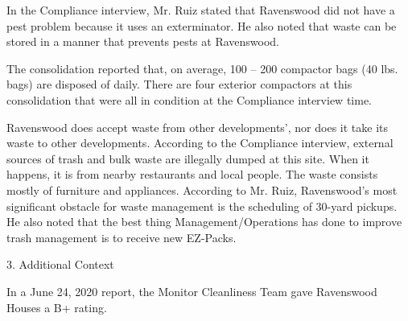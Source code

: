 In the Compliance interview, Mr. Ruiz stated that Ravenswood did not have a pest problem because it uses an exterminator. He also noted that waste can be stored in a manner that prevents pests at Ravenswood.

The consolidation reported that, on average, 100 -- 200 compactor bags (40 lbs. bags) are disposed of daily. There are four exterior compactors at this consolidation that were all in condition at the Compliance interview time.  

Ravenswood does accept waste from other developments', nor does it take its waste to other developments.  According to the Compliance interview, external sources of trash and bulk waste are illegally dumped at this site. When it happens, it is from nearby restaurants and local people. The waste consists mostly of furniture and appliances. According to Mr. Ruiz, Ravenswood's most significant obstacle for waste management is the scheduling of 30-yard pickups. He also noted that the best thing Management/Operations has done to improve trash management is to receive new EZ-Packs.

3. Additional Context

In a June 24, 2020 report, the Monitor Cleanliness Team gave Ravenswood Houses a B+ rating.